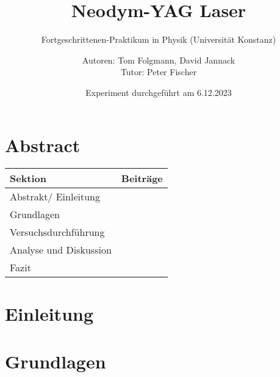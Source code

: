\documentclass[
    oneside, 
    footinclude=off, 
    captions=tableheading, 
    DIV=12;usenames,
    dvipsnames
]{scrartcl}
\begin{document}
    \title{Neodym-YAG Laser}
    \subtitle{Fortgeschrittenen-Praktikum in Physik (Universität Konstanz)}
    \author{Autoren: Tom Folgmann, David Jannack \\ \large{Tutor: Peter Fischer}}
    \date{Experiment durchgeführt am 6.12.2023}
    \maketitle
    \thispagestyle{empty}
    
    \section*{Abstract}
        

    \vspace{2cm}
    \begin{table}[H]
        \centering
            \begin{tabular}{l|l}
            Sektion & Beiträge \\\hline\hline
            Abstrakt/ Einleitung & \\
            Grundlagen & \\
            Versuchsdurchführung & \\
            Analyse und Diskussion & \\
            Fazit &
        \end{tabular}
    \end{table}

    \newpage


    \tableofcontents
    \thispagestyle{empty}	
    \newpage
    \setcounter{page}{1}


\newpage
\section{Einleitung}
    

\newpage
\section{Grundlagen}
    
\end{document}
